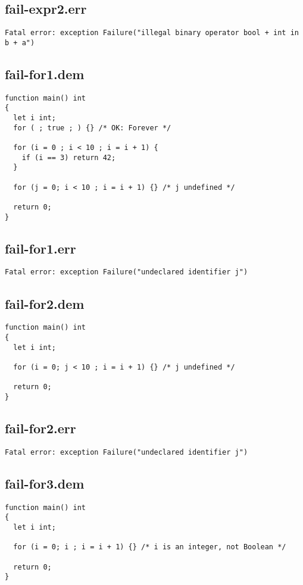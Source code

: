 \subsection{fail-expr2.err}
\begin{lstlisting}
Fatal error: exception Failure("illegal binary operator bool + int in b + a")
\end{lstlisting}
\subsection{fail-for1.dem}
\begin{lstlisting}
function main() int
{
  let i int;
  for ( ; true ; ) {} /* OK: Forever */

  for (i = 0 ; i < 10 ; i = i + 1) {
    if (i == 3) return 42;
  }

  for (j = 0; i < 10 ; i = i + 1) {} /* j undefined */

  return 0;
}
\end{lstlisting}
\subsection{fail-for1.err}
\begin{lstlisting}
Fatal error: exception Failure("undeclared identifier j")
\end{lstlisting}
\subsection{fail-for2.dem}
\begin{lstlisting}
function main() int
{
  let i int;

  for (i = 0; j < 10 ; i = i + 1) {} /* j undefined */

  return 0;
}
\end{lstlisting}
\subsection{fail-for2.err}
\begin{lstlisting}
Fatal error: exception Failure("undeclared identifier j")
\end{lstlisting}
\subsection{fail-for3.dem}
\begin{lstlisting}
function main() int
{
  let i int;

  for (i = 0; i ; i = i + 1) {} /* i is an integer, not Boolean */

  return 0;
}
\end{lstlisting}
